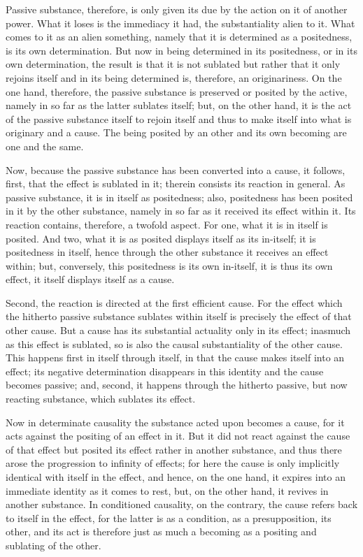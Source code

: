 Passive substance, therefore, is only given its due
by the action on it of another power.
What it loses is the immediacy it had,
the substantiality alien to it.
What comes to it as an alien something,
namely that it is determined as a positedness,
is its own determination.
But now in being determined in its positedness,
or in its own determination,
the result is that it is not sublated
but rather that it only rejoins itself
and in its being determined is,
therefore, an originariness.
On the one hand, therefore,
the passive substance is preserved
or posited by the active,
namely in so far as the latter sublates itself;
but, on the other hand, it is the act of
the passive substance itself to rejoin itself
and thus to make itself into
what is originary and a cause.
The being posited by an other
and its own becoming
are one and the same.

Now, because the passive substance has been converted into a cause,
it follows, first, that the effect is sublated in it;
therein consists its reaction in general.
As passive substance, it is in itself as positedness;
also, positedness has been posited in it by the other substance,
namely in so far as it received its effect within it.
Its reaction contains, therefore, a twofold aspect.
For one, what it is in itself is posited.
And two, what it is as posited
displays itself as its in-itself;
it is positedness in itself,
hence through the other substance it
receives an effect within;
but, conversely, this positedness is
its own in-itself,
it is thus its own effect,
it itself displays itself as a cause.

Second, the reaction is directed at
the first efficient cause.
For the effect which the hitherto
passive substance sublates within itself
is precisely the effect of that other cause.
But a cause has its substantial actuality only in its effect;
inasmuch as this effect is sublated,
so is also the causal substantiality of the other cause.
This happens first in itself through itself, in that
the cause makes itself into an effect;
its negative determination disappears
in this identity and the cause becomes passive;
and, second, it happens through the hitherto passive,
but now reacting substance,
which sublates its effect.

Now in determinate causality
the substance acted upon becomes a cause,
for it acts against the positing of an effect in it.
But it did not react against the cause of that effect
but posited its effect rather in another substance,
and thus there arose the progression to infinity of effects;
for here the cause is only implicitly
identical with itself in the effect,
and hence, on the one hand,
it expires into an immediate identity
as it comes to rest,
but, on the other hand,
it revives in another substance.
In conditioned causality, on the contrary,
the cause refers back to itself in the effect,
for the latter is as a condition,
as a presupposition, its other,
and its act is therefore just as much a becoming
as a positing and sublating of the other.

